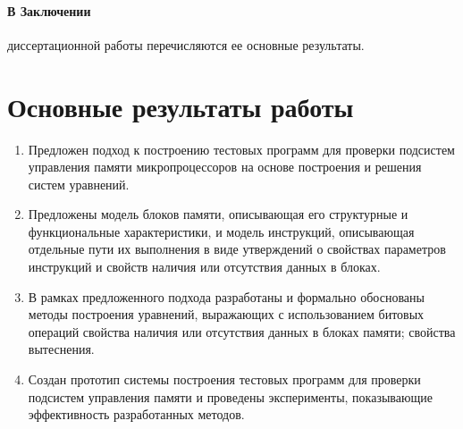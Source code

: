 \documentclass[14pt,autoref,href
,facsimile
]{disser}
\begin{document}
\paragraph{В Заключении} диссертационной работы перечисляются ее основные результаты.


\section*{Основные результаты работы}
\begin{enumerate}
  \item	Предложен подход к построению тестовых программ для проверки подсистем управления памяти микропроцессоров на основе построения и решения систем уравнений.

  \item Предложены модель блоков памяти, описывающая его структурные и функциональные характеристики, и модель инструкций, описывающая отдельные пути их выполнения в виде утверждений о свойствах параметров инструкций и свойств наличия или отсутствия данных в блоках.

  \item В рамках предложенного подхода разработаны и формально обоснованы методы построения уравнений, выражающих с использованием битовых операций свойства наличия или отсутствия данных в блоках памяти; свойства вытеснения.

  \item Создан прототип системы построения тестовых программ для проверки подсистем управления памяти и проведены эксперименты, показывающие эффективность разработанных методов.
\end{enumerate}


\renewcommand\bibsection{\section*{Публикации по теме диссертации}}


\end{document}
